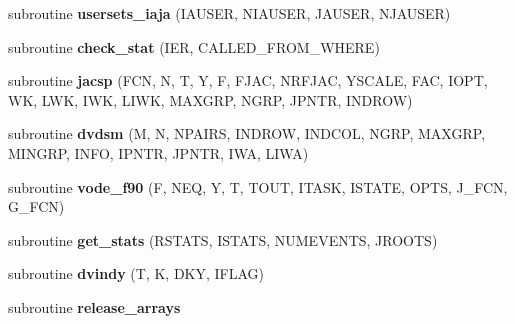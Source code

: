 \begin{DoxyCompactItemize}
subroutine {\bfseries usersets\+\_\+iaja} (I\+A\+U\+S\+ER, N\+I\+A\+U\+S\+ER, J\+A\+U\+S\+ER, N\+J\+A\+U\+S\+ER)
\item 
\mbox{\label{interfacekpp__root__integrator_1_1dvode__f90_ace2df733686378f3dbf4f04f001ea65f}} 
subroutine {\bfseries check\+\_\+stat} (I\+ER, C\+A\+L\+L\+E\+D\+\_\+\+F\+R\+O\+M\+\_\+\+W\+H\+E\+RE)
\item 
\mbox{\label{interfacekpp__root__integrator_1_1dvode__f90_a8363ad50e471b3fff2ab187165a6018d}} 
subroutine {\bfseries jacsp} (F\+CN, N, T, Y, F, F\+J\+AC, N\+R\+F\+J\+AC, Y\+S\+C\+A\+LE, F\+AC, I\+O\+PT, WK, L\+WK, I\+WK, L\+I\+WK, M\+A\+X\+G\+RP, N\+G\+RP, J\+P\+N\+TR, I\+N\+D\+R\+OW)
\item 
\mbox{\label{interfacekpp__root__integrator_1_1dvode__f90_a58f0efef1af8d488c8120287db3e358e}} 
subroutine {\bfseries dvdsm} (M, N, N\+P\+A\+I\+RS, I\+N\+D\+R\+OW, I\+N\+D\+C\+OL, N\+G\+RP, M\+A\+X\+G\+RP, M\+I\+N\+G\+RP, I\+N\+FO, I\+P\+N\+TR, J\+P\+N\+TR, I\+WA, L\+I\+WA)
\item 
\mbox{\label{interfacekpp__root__integrator_1_1dvode__f90_a8861b7452ea0cd7444e187287db271f2}} 
subroutine {\bfseries vode\+\_\+f90} (F, N\+EQ, Y, T, T\+O\+UT, I\+T\+A\+SK, I\+S\+T\+A\+TE, O\+P\+TS, J\+\_\+\+F\+CN, G\+\_\+\+F\+CN)
\item 
\mbox{\label{interfacekpp__root__integrator_1_1dvode__f90_a7f2adaf32f699d58af90ba0b38bdaa69}} 
subroutine {\bfseries get\+\_\+stats} (R\+S\+T\+A\+TS, I\+S\+T\+A\+TS, N\+U\+M\+E\+V\+E\+N\+TS, J\+R\+O\+O\+TS)
\item 
\mbox{\label{interfacekpp__root__integrator_1_1dvode__f90_abd01c7aab6576d5eef61cef406fb7d01}} 
subroutine {\bfseries dvindy} (T, K, D\+KY, I\+F\+L\+AG)
\item 
\mbox{\label{interfacekpp__root__integrator_1_1dvode__f90_ac848ac1df16bdedca248be90f2743f43}} 
subroutine {\bfseries release\+\_\+arrays}
\item 

\end{DoxyCompactItemize}
